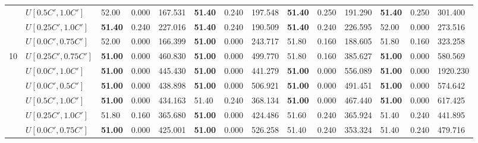 \begin{table}[h]
{\begin{tabular}{|l|l||l|l|l||l|l|l||l|l|l||l|l|l|}
       & $U[0.5C',1.0C']$ & 52.00 & 0.000 & 167.531 & \textbf{51.40} & 0.240 & 197.548 & \textbf{51.40} & 0.250 & 191.290 & \textbf{51.40} & 0.250 & 301.400 \\
       & $U[0.25C',1.0C']$ & \textbf{51.40} & 0.240 & 227.016 & \textbf{51.40} & 0.240 & 190.509 & \textbf{51.40} & 0.240 & 226.595 & 52.00 & 0.000 & 273.516 \\
       & $U[0.0C',0.75C']$ & 52.00 & 0.000 & 166.399 & \textbf{51.00} & 0.000 & 243.717 & 51.80 & 0.160 & 188.605 & 51.80 & 0.160 & 323.258 \\
      \hline\hline
      \multirow{6}{*}{10}
       & $U[0.25C',0.75C']$ & \textbf{51.00} & 0.000 & 460.830 & \textbf{51.00} & 0.000 & 499.770 & 51.80 & 0.160 & 385.627 & \textbf{51.00} & 0.000 & 580.569 \\
       & $U[0.0C',1.0C']$ & \textbf{51.00} & 0.000 & 445.430 & \textbf{51.00} & 0.000 & 441.279 & \textbf{51.00} & 0.000 & 556.089 & \textbf{51.00} & 0.000 & 1920.230 \\
       & $U[0.0C',0.5C']$ & \textbf{51.00} & 0.000 & 438.898 & \textbf{51.00} & 0.000 & 506.921 & \textbf{51.00} & 0.000 & 491.451 & \textbf{51.00} & 0.000 & 574.642 \\
       & $U[0.5C',1.0C']$ & \textbf{51.00} & 0.000 & 434.163 & 51.40 & 0.240 & 368.134 & \textbf{51.00} & 0.000 & 467.440 & \textbf{51.00} & 0.000 & 617.425 \\
       & $U[0.25C',1.0C']$ & 51.80 & 0.160 & 365.680 & \textbf{51.00} & 0.000 & 424.486 & 51.60 & 0.240 & 365.924 & 51.40 & 0.240 & 441.895 \\
       & $U[0.0C',0.75C']$ & \textbf{51.00} & 0.000 & 425.001 & \textbf{51.00} & 0.000 & 526.258 & 51.40 & 0.240 & 353.324 & 51.40 & 0.240 & 479.716 \\
      \hline
      \end{tabular}
      }
      \label{tab:in1}\end{table}


